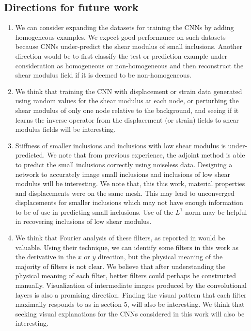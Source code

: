 \documentclass[12pt]{article}
\begin{document}
\subsection{Directions for future work}
\begin{enumerate}
\item{We can consider expanding the datasets for training the CNNs by adding homogeneous examples. We expect good performance on such datasets because CNNs under-predict the shear modulus of small inclusions. Another direction would be to first classify the test or prediction example under consideration as homogeneous or non-homogeneous and then reconstruct the shear modulus field if it is deemed to be non-homogeneous.}
\item{We think that training the CNN with displacement or strain data generated using random values for the shear modulus at each node, or perturbing the shear modulus of only one node relative to the background, and seeing if it learns the inverse operator from the displacement (or strain) fields to shear modulus fields will be interesting.}%
\item{Stiffness of smaller inclusions and inclusions with low shear modulus is under-predicted. We note that from previous experience, the adjoint method \cite{paper:oberai2003,paper:oberaipmb2004,paper:gokhale2008} is able to predict the small inclusions correctly using noiseless data. Designing a network to accurately image small inclusions and inclusions of low shear modulus will be interesting. We note that, this this work,  material properties and displacements were on the same mesh. This may lead to unconverged displacements for smaller inclusions which may not have enough information to be of use in predicting small inclusions. Use of the $L^1$ norm may be helpful in recovering inclusions of low shear modulus.}
\item{We think that Fourier analysis of these filters, as reported in \cite{paper:pateloberai2019} would be valuable. Using their technique, we can identify some filters in this work as the derivative in the $x$ or $y$ direction, but the physical meaning of the majority of filters is not clear. We believe that after understanding the physical meaning of each filter, better filters could perhaps be constructed manually. Visualization of intermediate images produced by the convolutional layers is also a promising direction. Finding the visual pattern that each filter maximally responds to as in \cite{book:chollet} section 5, will also be interesting. We think that seeking visual explanations \cite{paper:selvaraju_2019} for the CNNs considered in this work will also be interesting.}

\end{enumerate}
\end{document}
